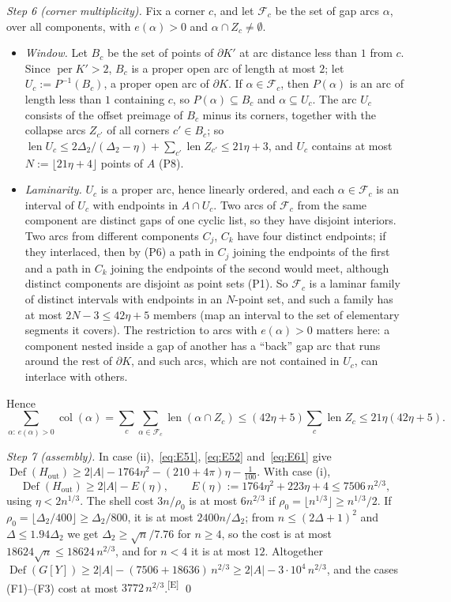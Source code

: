 \documentclass[11pt]{amsart}
\theoremstyle{definition}
\theoremstyle{remark}
\newcommand{\Dt}{\Delta_2}
\newcommand{\chk}[1]{\textsuperscript{[#1]}}
\begin{document}
\emph{Step 6 (corner multiplicity).} Fix a corner $c$, and let $\mathcal F_c$ be the set of gap arcs $\alpha$, over all components, with $e(\alpha)>0$ and $\alpha\cap Z_c\neq\emptyset$.
\begin{itemize}[leftmargin=2em]
\item \emph{Window.} Let $B_c$ be the set of points of $\partial K'$ at arc distance less than $1$ from $c$. Since $\operatorname{per}K'>2$, $B_c$ is a proper open arc of length at most $2$; let $U_c:=P^{-1}(B_c)$, a proper open arc of $\partial K$. If $\alpha\in\mathcal F_c$, then $P(\alpha)$ is an arc of length less than $1$ containing $c$, so $P(\alpha)\subseteq B_c$ and $\alpha\subseteq U_c$. The arc $U_c$ consists of the offset preimage of $B_c$ minus its corners, together with the collapse arcs $Z_{c'}$ of all corners $c'\in B_c$; so $\operatorname{len}U_c\le2\Dt/(\Dt-\eta)+\sum_{c'}\operatorname{len}Z_{c'}\le21\eta+3$, and $U_c$ contains at most $N:=\lfloor21\eta+4\rfloor$ points of $A$ (P8).
\item \emph{Laminarity.} $U_c$ is a proper arc, hence linearly ordered, and each $\alpha\in\mathcal F_c$ is an interval of $U_c$ with endpoints in $A\cap U_c$. Two arcs of $\mathcal F_c$ from the same component are distinct gaps of one cyclic list, so they have disjoint interiors. Two arcs from different components $C_j$, $C_k$ have four distinct endpoints; if they interlaced, then by (P6) a path in $C_j$ joining the endpoints of the first and a path in $C_k$ joining the endpoints of the second would meet, although distinct components are disjoint as point sets (P1). So $\mathcal F_c$ is a laminar family of distinct intervals with endpoints in an $N$-point set, and such a family has at most $2N-3\le42\eta+5$ members (map an interval to the set of elementary segments it covers). The restriction to arcs with $e(\alpha)>0$ matters here: a component nested inside a gap of another has a ``back'' gap arc that runs around the rest of $\partial K$, and such arcs, which are not contained in $U_c$, can interlace with others.
\end{itemize}
Hence
\begin{equation}\label{eq:E61}
\sum_{\alpha:\,e(\alpha)>0}\operatorname{col}(\alpha)=\sum_c\sum_{\alpha\in\mathcal F_c}\operatorname{len}(\alpha\cap Z_c)\le(42\eta+5)\sum_c\operatorname{len}Z_c\le21\eta(42\eta+5).
\end{equation}

\emph{Step 7 (assembly).} In case (ii),~\eqref{eq:E51}, \eqref{eq:E52} and~\eqref{eq:E61} give $\operatorname{Def}(H_{\mathrm{out}})\ge2|A|-1764\eta^2-(210+4\pi)\eta-\frac1{100}$. With case (i),
\[
\operatorname{Def}(H_{\mathrm{out}})\ge2|A|-E(\eta),\qquad E(\eta):=1764\eta^2+223\eta+4\le7506\,n^{2/3},
\]
using $\eta<2n^{1/3}$. The shell cost $3n/\rho_0$ is at most $6n^{2/3}$ if $\rho_0=\lfloor n^{1/3}\rfloor\ge n^{1/3}/2$. If $\rho_0=\lfloor\Dt/400\rfloor\ge\Dt/800$, it is at most $2400n/\Dt$; from $n\le(2\Delta+1)^2$ and $\Delta\le1.94\Dt$ we get $\Dt\ge\sqrt n/7.76$ for $n\ge4$, so the cost is at most $18624\sqrt n\le18624\,n^{2/3}$, and for $n<4$ it is at most $12$. Altogether $\operatorname{Def}(G[Y])\ge2|A|-(7506+18636)\,n^{2/3}\ge2|A|-3\cdot10^4\,n^{2/3}$, and the cases (F1)--(F3) cost at most $3772\,n^{2/3}$.\chk{E} \qed
\end{document}
